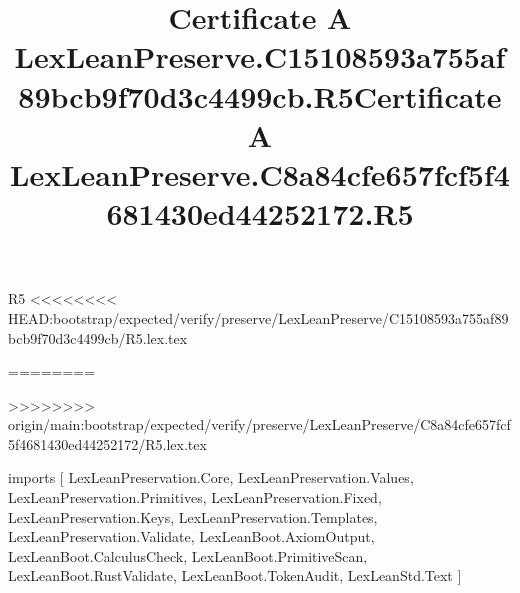 \begin{lexlean}{R5}
<<<<<<<< HEAD:bootstrap/expected/verify/preserve/LexLeanPreserve/C15108593a755af89bcb9f70d3c4499cb/R5.lex.tex
\title{Certificate A LexLeanPreserve.C15108593a755af89bcb9f70d3c4499cb.R5}
========
\title{Certificate A LexLeanPreserve.C8a84cfe657fcf5f4681430ed44252172.R5}
>>>>>>>> origin/main:bootstrap/expected/verify/preserve/LexLeanPreserve/C8a84cfe657fcf5f4681430ed44252172/R5.lex.tex
\begin{coremodule}
imports [
  LexLeanPreservation.Core,
  LexLeanPreservation.Values,
  LexLeanPreservation.Primitives,
  LexLeanPreservation.Fixed,
  LexLeanPreservation.Keys,
  LexLeanPreservation.Templates,
  LexLeanPreservation.Validate,
  LexLeanBoot.AxiomOutput,
  LexLeanBoot.CalculusCheck,
  LexLeanBoot.PrimitiveScan,
  LexLeanBoot.RustValidate,
  LexLeanBoot.TokenAudit,
  LexLeanStd.Text
]


\end{coremodule}
\end{lexlean}
